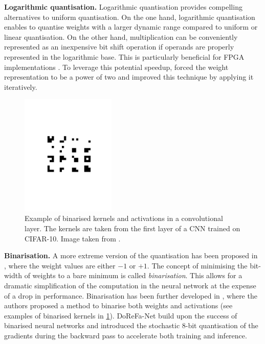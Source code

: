 \noindent\textbf{Logarithmic quantisation.} Logarithmic quantisation provides compelling alternatives to uniform
quantisation. On the one hand, logarithmic quantisation enables to quantise
weights with a larger dynamic range compared to uniform or linear quantisation.
On the other hand, multiplication can be conveniently represented as an
inexpensive bit shift operation if operands are properly represented in the
logarithmic base. This is particularly beneficial for \ac{FPGA} implementations
\cite{alemdar2017ternary}. To leverage this potential speedup,
\cite{DBLP:journals/corr/LinCMB15} forced the weight representation to be a
power of two and \cite{DBLP:conf/iclr/ZhouYGXC17} improved this technique by
applying it iteratively.\\


\begin{figure}[htbp]
  \centering
  \includegraphics[width=0.40\textwidth,trim=5cm 9cm 5cm 9cm, clip]{chapter_sota/assets/binarised_kernels.pdf}
  \caption{Example of binarised kernels and activations in a convolutional
    layer. The kernels are taken from the first layer of a \ac{CNN} trained on CIFAR-10.
    Image taken from \cite{DBLP:conf/nips/HubaraCSEB16}.}
  \label{fig:sota:binarised_kernels}
\end{figure}

\noindent\textbf{Binarisation.} A more extreme version of the quantisation has
been proposed in \cite{courbariaux2015binaryconnect}, where the weight values
are either $-1$ or $+1$. The concept of minimising the bit-width of weights to a
bare minimum is called \emph{binarisation}. This allows for a dramatic
simplification of the computation in the neural network at the expense of a drop
in performance. Binarisation has been further developed in
\cite{DBLP:conf/nips/HubaraCSEB16}, where the authors proposed a method to
binarise both weights and activations (see examples of binarised kernels in
\cref{fig:sota:binarised_kernels}). DoReFa-Net \cite{zhou2016dorefa} build upon
the success of binarised neural networks and introduced the stochastic 8-bit
quantisation of the gradients during the backward pass to accelerate both
training and inference.\\

